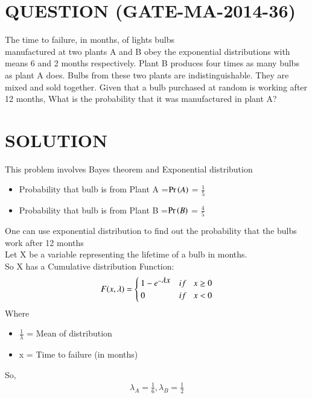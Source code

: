 \documentclass[journal,12pt,twocolumn]{IEEEtran}
\begin{document}
\section*{QUESTION (GATE-MA-2014-36)}
The time to failure, in months, of lights bulbs \\manufactured at two plants A and B
obey the exponential distributions with means 6 and 2 months respectively. Plant B produces
four times as many bulbs as plant A does. Bulbs from these two plants are indistinguishable.
They are mixed and sold together. Given that a bulb purchased at random is working after 12 months, What is the probability that it was manufactured in plant A?
\section*{SOLUTION}
This problem involves Bayes theorem and \newline Exponential distribution
\bigskip
\begin{itemize}
    \item Probability that bulb is from Plant A =\newline $\Pr\left(A\right)$ = \(\frac{1}{5}\)
    \item Probability that bulb is from Plant B =\newline$\Pr\left(B\right)$ = \( \frac{4}{5} \)
\end{itemize}
\bigskip
One can use exponential distribution to find out the probability that the bulbs work after 12 months\\
Let X be a variable representing the lifetime of a bulb in months.\\
So X has a Cumulative distribution Function:
\begin{equation}
    F(x,\lambda) =
    \begin{cases}
        1 - {e}^{-\displaystyle\lambda x} & if \hspace{0.3cm}x \geq 0\\
        0       & if \hspace{0.3cm}x < 0
    \end{cases}
\end{equation}
Where
\begin{itemize}
    \item $\frac{1}{\displaystyle\lambda}$ = Mean of distribution
    \newline
    \item x = Time to failure (in months)
\end{itemize}
\bigskip
So,
\begin{align}
    \lambda_A = \frac{1}{6} , \lambda_B = \frac{1}{2}
\end{align}
\end{document}
